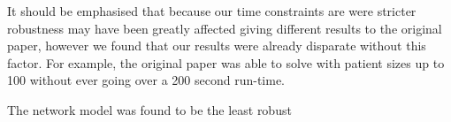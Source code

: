 It should be emphasised that because our time constraints are were stricter robustness may have been greatly affected giving different results to the original paper, however we found that our results were already disparate without this factor. For example, the original paper was able to solve with patient sizes up to 100 without ever going over a 200 second run-time.

The network model was found to be the least robust


